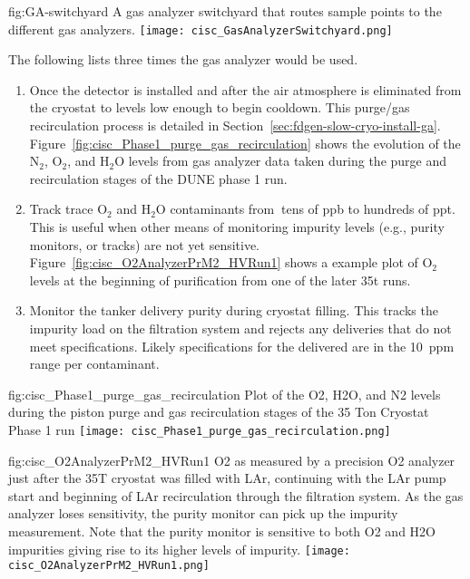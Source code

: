 \begin{dunefigure}{fig:GA-switchyard}
  {A gas analyzer switchyard that routes sample points to the different gas analyzers.}
  \texttt{[image: cisc\_GasAnalyzerSwitchyard.png]}
\end{dunefigure}

The following lists three times the gas analyzer would be used.


\begin{enumerate}
\item Once the detector is installed and after the air atmosphere is eliminated from the cryostat to levels low enough to begin cooldown. This purge/gas recirculation process is detailed in Section~\ref{sec:fdgen-slow-cryo-install-ga}. Figure~\ref{fig:cisc_Phase1_purge_gas_recirculation} shows the evolution of the $\text{N}_2$, $\text{O}_2$, and $\text{H}_2\text{O}$ levels from gas analyzer data taken during the purge and recirculation stages of the DUNE  %
phase 1 run.

\item Track trace $\text{O}_2$ and $\text{H}_2\text{O}$ contaminants from $\>$tens of ppb to hundreds of ppt. This is useful when other means of monitoring impurity levels (e.g., purity monitors, or  tracks) are not yet sensitive. Figure~\ref{fig:cisc_O2AnalyzerPrM2_HVRun1} shows a example plot of $\text{O}_2$ levels at the beginning of  purification from one of the later \num{35}\si{t} %
 runs.

\item Monitor the tanker  delivery purity during cryostat filling. This tracks the impurity load on the filtration system and rejects any deliveries that do not meet specifications. Likely specifications for the delivered  are in the \SI{10}{ppm} range per contaminant.

\end{enumerate}

\begin{dunefigure}{fig:cisc_Phase1_purge_gas_recirculation}
  {Plot of the O2, H2O, and N2 levels during the piston purge and gas recirculation stages of the 35 Ton Cryostat Phase 1 run}
  \texttt{[image: cisc\_Phase1\_purge\_gas\_recirculation.png]}
\end{dunefigure}

\begin{dunefigure}{fig:cisc_O2AnalyzerPrM2_HVRun1}
  {O2 as measured by a precision O2 analyzer just after the 35T cryostat was filled with LAr, continuing with the LAr pump start and beginning of LAr recirculation through the filtration system. As the gas analyzer loses sensitivity, the purity monitor can pick up the impurity measurement. Note that the purity monitor is sensitive to both O2 and H2O impurities giving rise to its higher levels of impurity.}
  \texttt{[image: cisc\_O2AnalyzerPrM2\_HVRun1.png]}
\end{dunefigure}

